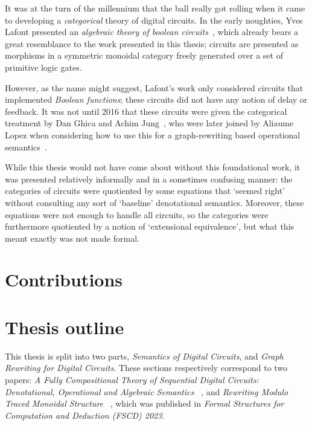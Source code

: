 It was at the turn of the millennium that the ball really got rolling when it
came to developing a \emph{categorical} theory of digital circuits.
In the early noughties, Yves Lafont presented an
\emph{algebraic theory of boolean circuits}~\cite{lafont2003algebraic}, which
already bears a great resemblance to the work presented in this thesis; circuits
are presented as morphisms in a symmetric monoidal category freely generated
over a set of primitive logic gates.

However, as the name might suggest, Lafont's work only considered circuits that
implemented \emph{Boolean functions}; these circuits did not have any notion of
delay or feedback.
It was not until 2016 that these circuits were given the categorical treatment
by Dan Ghica and Achim Jung~\cite{ghica2016categorical}, who were later joined
by Aliaume Lopez when considering how to use this for a graph-rewriting based
operational semantics~\cite{ghica2017diagrammatic}.

While this thesis would not have come about without this foundational work, it
was presented relatively informally and in a sometimes confusing manner:
the categories of circuits were quotiented by some equations that `seemed right'
without consulting any sort of `baseline' denotational semantics.
Moreover, these equations were not enough to handle all circuits, so the
categories were furthermore quotiented by a notion of `extensional equivalence',
but what this meant exactly was not made formal.

\section{Contributions}



\section{Thesis outline}

This thesis is split into two parts, \emph{Semantics of Digital Circuits}, and
\emph{Graph Rewriting for Digital Circuits}.
These sections respectively correspond to two papers:
\emph{%
    A Fully Compositional Theory of Sequential Digital Circuits:
    Denotational, Operational and Algebraic Semantics%
}~\cite{ghica2024fully}, and \emph{%
    Rewriting Modulo Traced Monoidal Structure%
}~\cite{ghica2023rewriting}, which was published in
\emph{Formal Structures for Computation and Deduction (FSCD) 2023}.

